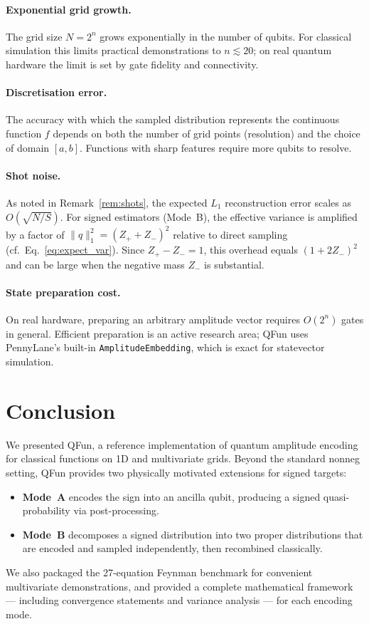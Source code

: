 \documentclass[11pt]{article}
\begin{document}
\paragraph{Exponential grid growth.}
The grid size $N=2^n$ grows exponentially in the number of qubits.
For classical simulation this limits practical demonstrations to
$n\lesssim 20$; on real quantum hardware the limit is set by gate
fidelity and connectivity.

\paragraph{Discretisation error.}
The accuracy with which the sampled distribution represents the
continuous function $f$ depends on both the number of grid points
(resolution) and the choice of domain $[a,b]$.  Functions with sharp
features require more qubits to resolve.

\paragraph{Shot noise.}
As noted in Remark~\ref{rem:shots}, the expected $L_1$ reconstruction
error scales as $O(\sqrt{N/S})$.  For signed estimators (Mode~B),
the effective variance is amplified by a factor of
$\|q\|_1^2 = (Z_++Z_-)^2$ relative to direct sampling
(cf.\ Eq.~\eqref{eq:expect_var}).  Since $Z_+-Z_-=1$, this overhead
equals $(1+2Z_-)^2$ and can be large when the negative mass $Z_-$ is
substantial.

\paragraph{State preparation cost.}
On real hardware, preparing an arbitrary amplitude vector requires
$O(2^n)$ gates in general.  Efficient preparation is an active
research area; QFun uses PennyLane's built-in
\texttt{AmplitudeEmbedding}, which is exact for statevector
simulation.

\section{Conclusion}
\label{sec:conclusion}

We presented QFun, a reference implementation of quantum amplitude
encoding for classical functions on 1D and multivariate grids.
Beyond the standard nonneg setting, QFun provides two physically
motivated extensions for signed targets:
\begin{itemize}
  \item \textbf{Mode~A} encodes the sign into an ancilla qubit,
        producing a signed quasi-probability via post-processing.
  \item \textbf{Mode~B} decomposes a signed distribution into two
        proper distributions that are encoded and sampled
        independently, then recombined classically.
\end{itemize}
We also packaged the 27-equation Feynman benchmark for convenient
multivariate demonstrations, and provided a complete mathematical
framework --- including convergence statements and variance
analysis --- for each encoding mode.



\end{document}
